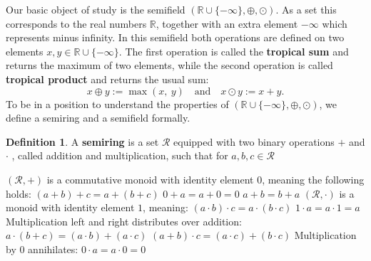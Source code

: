 \documentclass{article}
\theoremstyle{definition}
\newtheorem{definition}[theorem]{Definition}
\begin{document}
Our basic object of study is the semifield $( \mathbb{R} \cup \{- \infty \} , \oplus , \odot )$. As a set this corresponds to the real numbers $ \mathbb{R} $, together with an extra element $- \infty $ which represents minus infinity. In this semifield both operations are defined on two elements $x, y \in \mathbb{R} \cup \{- \infty \}$. The first operation is called the \textbf{tropical sum} and returns the maximum of two elements, while the second operation is called \textbf{tropical product} and returns the usual sum:
$$ x \oplus y := \max(x,\ y) \quad \text{and} \quad x \odot y := x+y.$$
To be in a position to understand the properties of $( \mathbb{R} \cup \{- \infty \} , \oplus , \odot )$, we define a semiring and a semifield formally.
\begin{definition}\hspace{1sp}\cite{berstel1985theory}
A \textbf{semiring} is a set $\mathcal{R}$ equipped with two binary operations $+$ and $\cdot$ , called addition and multiplication, such that for $a, b, c \in \mathcal{R}$ \\
\begin{outline}
  \1 $(\mathcal{R}, +)$ is a commutative monoid with identity element 0, meaning the following holds:
    \2 $(a + b) + c = a + (b + c)$
    \2 $0 + a = a + 0 = 0$
    \2 $a + b = b + a$
  \1 $(\mathcal{R}, \cdot)$ is a monoid with identity element $1$, meaning:
    \2 $(a \cdot b) \cdot c = a \cdot (b \cdot c)$
    \2 $ 1 \cdot a = a \cdot 1 = a $
  \1 Multiplication left and right distributes over addition:
    \2 $ a \cdot (b + c) = (a \cdot b) + (a \cdot c)$
    \2 $ (a + b) \cdot c = (a \cdot c) + (b \cdot c)$
  \1 Multiplication by 0 annihilates:
    \2 $ 0 \cdot a = a \cdot 0 = 0$
\end{outline}
\end{definition}
\end{document}

